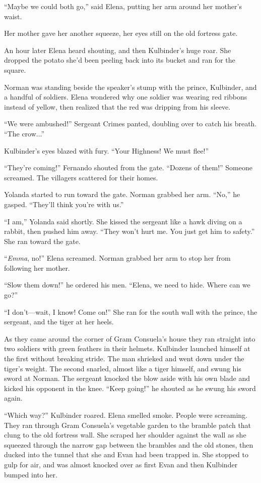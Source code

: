\documentclass[10pt]{book}
\begin{document}
``Maybe we could both go,'' said Elena, putting her arm around her mother's waist.

Her mother gave her another squeeze, her eyes still on the old fortress gate.

An hour later Elena heard shouting, and then Kulbinder's huge roar. She dropped the potato she'd been peeling back into its bucket and ran for the square.

Norman was standing beside the speaker's stump with the prince, Kulbinder, and a handful of soldiers. Elena wondered why one soldier was wearing red ribbons instead of yellow, then realized that the red was dripping from his sleeve.

``We were ambushed!'' Sergeant Crimes panted, doubling over to catch his breath.  ``The crow...''

Kulbinder's eyes blazed with fury. ``Your Highness! We must flee!''

``They're coming!'' Fernando shouted from the gate. ``Dozens of them!'' Someone screamed. The villagers scattered for their homes.

Yolanda started to run toward the gate. Norman grabbed her arm. ``No,'' he gasped. ``They'll think you're with us.''

``I am,'' Yolanda said shortly. She kissed the sergeant like a hawk diving on a rabbit, then pushed him away. ``They won't hurt me. You just get him to safety.'' She ran toward the gate.

``\emph{Emma}, no!'' Elena screamed. Norman grabbed her arm to stop her from following her mother.

``Slow them down!'' he ordered his men.  ``Elena, we need to hide. Where can we go?''

``I don't---wait, I know! Come on!'' She ran for the south wall with the prince, the sergeant, and the tiger at her heels.

As they came around the corner of Gram Consuela's house they ran straight into two soldiers with green feathers in their helmets. Kulbinder launched himself at the first without breaking stride. The man shrieked and went down under the tiger's weight. The second snarled, almost like a tiger himself, and swung his sword at Norman. The sergeant knocked the blow aside with his own blade and kicked his opponent in the knee. ``Keep going!'' he shouted as he swung his sword again.

``Which way?'' Kulbinder roared. Elena smelled smoke.  People were screaming. They ran through Gram Consuela's vegetable garden to the bramble patch that clung to the old fortress wall. She scraped her shoulder against the wall as she squeezed through the narrow gap between the brambles and the old stones, then ducked into the tunnel that she and Evan had been trapped in. She stopped to gulp for air, and was almost knocked over as first Evan and then Kulbinder bumped into her.
\end{document}

